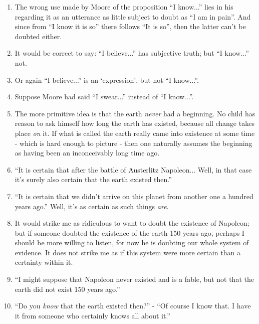 \documentclass{book}
\begin{document}
\begin{enumerate}
\item
The wrong use made by Moore of the proposition ``I know...'' lies in his
regarding it as an utterance as little subject to doubt as ``I am in pain''.
And since from ``I know it is so'' there follows ``It is so'', then the latter
can't be doubted either.

\item
It would be correct to say: ``I believe...'' has subjective truth; but ``I
know...'' not.

\item
Or again ``I believe...'' is an `expression', but not ``I know...''.

\item
Suppose Moore had said ``I swear...'' instead of ``I know...''.

\item
The more primitive idea is that the earth \emph{never} had a beginning. No
child has reason to ask himself how long the earth has existed, because all
change takes place \emph{on} it. If what is called the earth really came into
existence at some time - which is hard enough to picture - then one naturally
assumes the beginning as having been an inconceivably long time ago.

\item
``It is certain that after the battle of Austerlitz Napoleon... Well, in that
case it's surely also certain that the earth existed then.''

\item
``It is certain that we didn't arrive on this planet from another one a hundred
years ago.'' Well, it's as certain as such things \emph{are}.

\item
It would strike me as ridiculous to want to doubt the existence of Napoleon;
but if someone doubted the existence of the earth 150 years ago, perhaps I
should be more willing to listen, for now he is doubting our whole system of
evidence. It does not strike me as if this system were more certain than a
certainty within it.

\item
``I might suppose that Napoleon never existed and is a fable, but not that the
earth did not exist 150 years ago.''

\item
``Do you \emph{know} that the earth existed then?'' - ``Of course I know that.
I have it from someone who certainly knows all about it.''


\end{enumerate}
\end{document}
